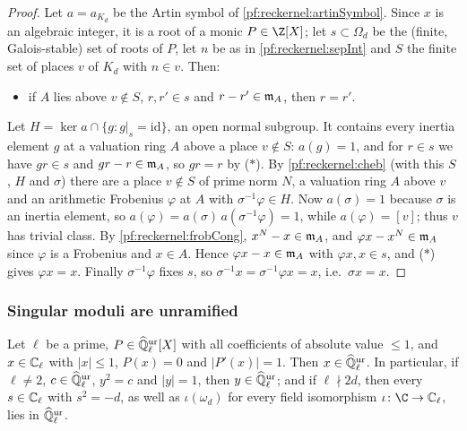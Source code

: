 \begin{proof}
Let $a=a_{K_d}$ be the Artin symbol of \cref{pf:reckernel:artinSymbol}. Since $x$ is an algebraic integer, it is a
root of a monic $P\in\Z[X]$; let $s\subset\Omega_d$ be the (finite, Galois-stable) set of roots of $P$, let $n$ be
as in \cref{pf:reckernel:sepInt} and $S$ the finite set of places $v$ of $K_d$ with $n\in v$. Then:
\begin{itemize}
\item[($\ast$)] if $A$ lies above $v\notin S$, $r,r'\in s$ and $r-r'\in\mathfrak{m}_A$, then $r=r'$.
\end{itemize}
Let $H=\ker a\cap\{g: g|_s=\mathrm{id}\}$, an open normal subgroup. It contains every inertia element $g$ at a
valuation ring $A$ above a place $v\notin S$: $a(g)=1$, and for $r\in s$ we have $gr\in s$ and $gr-r\in\mathfrak{m}_A$, so
$gr=r$ by ($\ast$). By \cref{pf:reckernel:cheb} (with this $S$, $H$ and $\sigma$) there are a place $v\notin S$ of prime norm $N$, a valuation ring $A$ above $v$ and an arithmetic
Frobenius $\varphi$ at $A$ with $\sigma^{-1}\varphi\in H$. Now $a(\sigma)=1$ because $\sigma$ is an inertia element,
so $a(\varphi)=a(\sigma)\,a(\sigma^{-1}\varphi)=1$, while $a(\varphi)=[v]$; thus $v$ has trivial class. By
\cref{pf:reckernel:frobCong}, $x^N-x\in\mathfrak{m}_A$, and $\varphi x-x^N\in\mathfrak{m}_A$ since $\varphi$ is a Frobenius
and $x\in A$. Hence $\varphi x-x\in\mathfrak{m}_A$ with $\varphi x,x\in s$, and ($\ast$) gives $\varphi x=x$. Finally
$\sigma^{-1}\varphi$ fixes $s$, so $\sigma^{-1}x=\sigma^{-1}\varphi x=x$, i.e.\ $\sigma x=x$.
\end{proof}

\subsubsection{Singular moduli are unramified}

\begin{lemma}\label{pf:reckernel:hensel}
Let $\ell$ be a prime, $P\in\widehat{\mathbb{Q}}{}_\ell^{\mathrm{ur}}[X]$ with all coefficients of absolute value $\le1$, and $x\in\mathbb{C}_\ell$ with
$|x|\le1$, $P(x)=0$ and $|P'(x)|=1$. Then $x\in\widehat{\mathbb{Q}}{}_\ell^{\mathrm{ur}}$. In particular, if $\ell\ne2$, $c\in\widehat{\mathbb{Q}}{}_\ell^{\mathrm{ur}}$, $y^2=c$ and
$|y|=1$, then $y\in\widehat{\mathbb{Q}}{}_\ell^{\mathrm{ur}}$; and if $\ell\nmid 2d$, then every $s\in\mathbb{C}_\ell$ with $s^2=-d$, as well as
$\iota(\omega_d)$ for every field isomorphism $\iota\colon\C\to\reckCl$, lies in $\widehat{\mathbb{Q}}{}_\ell^{\mathrm{ur}}$.
\end{lemma}

